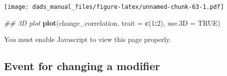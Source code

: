 \documentclass[]{book}
\newenvironment{Shaded}{\begin{snugshade}}{\end{snugshade}}
\newcommand{\CommentTok}[1]{\textcolor[rgb]{0.56,0.35,0.01}{\textit{#1}}}
\newcommand{\DataTypeTok}[1]{\textcolor[rgb]{0.13,0.29,0.53}{#1}}
\newcommand{\DecValTok}[1]{\textcolor[rgb]{0.00,0.00,0.81}{#1}}
\newcommand{\KeywordTok}[1]{\textcolor[rgb]{0.13,0.29,0.53}{\textbf{#1}}}
\newcommand{\NormalTok}[1]{#1}
\newcommand{\OperatorTok}[1]{\textcolor[rgb]{0.81,0.36,0.00}{\textbf{#1}}}
\newcommand{\OtherTok}[1]{\textcolor[rgb]{0.56,0.35,0.01}{#1}}
\begin{document}
\texttt{[image: dads\_manual\_files/figure-latex/unnamed-chunk-63-1.pdf]}

\begin{Shaded}
\begin{Highlighting}[]
\CommentTok{## 3D plot}
\KeywordTok{plot}\NormalTok{(change_correlation, }\DataTypeTok{trait =} \KeywordTok{c}\NormalTok{(}\DecValTok{1}\OperatorTok{:}\DecValTok{2}\NormalTok{), }\DataTypeTok{use.3D =} \OtherTok{TRUE}\NormalTok{)}
\end{Highlighting}
\end{Shaded}

\hypertarget{unnamed_chunk_64div}{}

You must enable Javascript to view this page properly.

\hypertarget{event-for-changing-a-modifier}{%
\subsection{Event for changing a modifier}\label{event-for-changing-a-modifier}}
\end{document}
